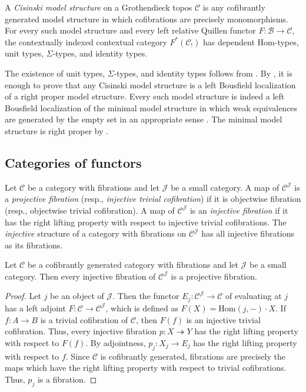 \documentclass[reqno]{amsart}
\theoremstyle{definition}
\theoremstyle{remark}
\newcommand{\fs}[1]{\mathrm{#1}}
\newcommand{\scat}[1]{\mathcal{#1}}
\newcommand{\Hom}{\fs{Hom}}
\numberwithin{figure}{section}
\begin{document}
\begin{example}
A \emph{Cisinski model structure} on a Grothendieck topos $\scat{C}$ is any cofibrantly generated model structure in which cofibrations are precisely monomorphisms.
For every such model structure and every left relative Quillen functor $F : \scat{B} \to \scat{C}$,
the contextually indexed contextual category $F^*(\scat{C}_!)$ has dependent $\Hom$-types, unit types, $\Sigma$-types, and identity types.

The existence of unit types, $\Sigma$-types, and identity types follows from .
By , it is enough to prove that any Cisinski model structure is a left Bousfield localization of a right proper model structure.
Every such model structure is indeed a left Bousfield localization of the minimal model structure in which weak equivalences are generated by the empty set in an appropriate sense \cite[Th\'{e}or\`{e}me~3.9]{cisinski}.
The minimal model structure is right proper by \cite[Remarque~4.9]{cisinski}.
\end{example}

\subsection{Categories of functors}

Let $\scat{C}$ be a category with fibrations and let $\scat{J}$ be a small category.
A map of $\scat{C}^\scat{J}$ is a \emph{projective fibration} (resp., \emph{injective trivial cofibration}) if it is objectwise fibration (resp., objectwise trivial cofibration).
A map of $\scat{C}^\scat{J}$ is an \emph{injective fibration} if it has the right lifting property with respect to injective trivial cofibrations.
The \emph{injective} structure of a category with fibrations on $\scat{C}^\scat{J}$ has all injective fibrations as its fibrations.

\begin{lem}
Let $\scat{C}$ be a cofibrantly generated category with fibrations and let $\scat{J}$ be a small category.
Then every injective fibration of $\scat{C}^\scat{J}$ is a projective fibration.
\end{lem}
\begin{proof}
Let $j$ be an object of $\scat{J}$.
Then the functor $E_j : \scat{C}^\scat{J} \to \scat{C}$ of evaluating at $j$ has a left adjoint $F : \scat{C} \to \scat{C}^\scat{J}$, which is defined as $F(X) = \Hom(j,-) \cdot X$.
If $f : A \to B$ is a trivial cofibration of $\scat{C}$, then $F(f)$ is an injective trivial cofibration.
Thus, every injective fibration $p : X \twoheadrightarrow Y$ has the right lifting property with respect to $F(f)$.
By adjointness, $p_j : X_j \to E_j$ has the right lifting property with respect to $f$.
Since $\scat{C}$ is cofibrantly generated, fibrations are precisely the maps which have the right lifting property with respect to trivial cofibrations.
Thus, $p_j$ is a fibration.
\end{proof}
\end{document}
